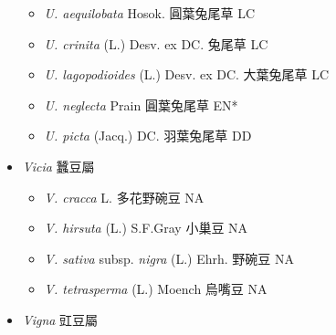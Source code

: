 \begin{itemize}
  \begin{itemize}
        \item[] \textit{U. aequilobata} Hosok.  圓葉兔尾草   LC
        \item[] \textit{U. crinita} (L.) Desv. ex DC.  兔尾草   LC
        \item[] \textit{U. lagopodioides} (L.) Desv. ex DC.  大葉兔尾草   LC
        \item[] \textit{U. neglecta} Prain  圓葉兔尾草   EN*
        \item[] \textit{U. picta} (Jacq.) DC.  羽葉兔尾草   DD
  \end{itemize}
 \item[] \textit{Vicia} 蠶豆屬
                                
  \begin{itemize}
        \item[] \textit{V. cracca} L.  多花野碗豆   NA
        \item[] \textit{V. hirsuta} (L.) S.F.Gray  小巢豆   NA
        \item[] \textit{V. sativa} subsp. \textit{nigra} (L.) Ehrh.  野碗豆   NA
        \item[] \textit{V. tetrasperma} (L.) Moench  烏嘴豆   NA
  \end{itemize}
 \item[] \textit{Vigna} 豇豆屬
                                

\end{itemize}
